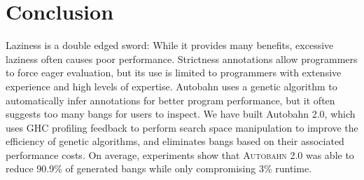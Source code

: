 \documentclass[format=sigplan, review=true]{acmart}
\newcommand{\At}[0]{\textsc{Autobahn 2.0}}
\begin{document}
\section{Conclusion}

Laziness is a double edged sword: While it provides many benefits,
excessive laziness often causes poor performance. Strictness
annotations allow programmers to force eager evaluation, but its use
is limited to programmers with extensive experience and high levels of
expertise. Autobahn uses a genetic algorithm to automatically infer
annotations for better program performance, but it often suggests too
many bangs for users to inspect. We have built Autobahn 2.0, which
uses GHC profiling feedback to perform search space manipulation to
improve the efficiency of genetic algorithms, and eliminates bangs
based on their associated performance costs. On average, experiments
show that \At{} was able to reduce 90.9\% of generated bangs while
only compromising 3\% runtime.



\end{document}
